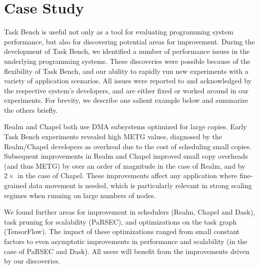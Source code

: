 \section{Case Study}
\label{sec:case-study}

Task Bench is useful not only as a tool for evaluating programming
system performance, but also for discovering potential areas for
improvement. During the development of Task Bench, we identified a
number of performance issues in the underlying programming
systems. These discoveries were possible because of the flexibility of
Task Bench, and our ability to rapidly run new experiments with a
variety of application scenarios. All issues were reported to and
acknowledged by the respective system's developers, and are either
fixed or worked around in our experiments. For brevity, we describe
one salient example below and summarize the others briefly.

Realm and Chapel both use DMA subsystems optimized for large
copies. Early Task Bench experiments revealed high METG values,
diagnosed by the Realm/Chapel developers as overhead due to the
cost of scheduling small copies. Subsequent improvements in Realm and
Chapel improved small copy overheads (and thus METG) by over an order
of magnitude in the case of Realm, and by $2\times$ in the case of
Chapel. These improvements affect any application where fine-grained
data movement is needed, which is particularly relevant in strong scaling
regimes when running on large numbers of nodes.

We found further areas for improvement in schedulers (Realm, Chapel
and Dask), task pruning for scalability (PaRSEC), and optimizations on
the task graph (TensorFlow). The impact of these optimizations ranged
from small constant factors to even asymptotic improvements in
performance and scalability (in the case of PaRSEC and Dask). All
users will benefit from the improvements driven by our discoveries.

